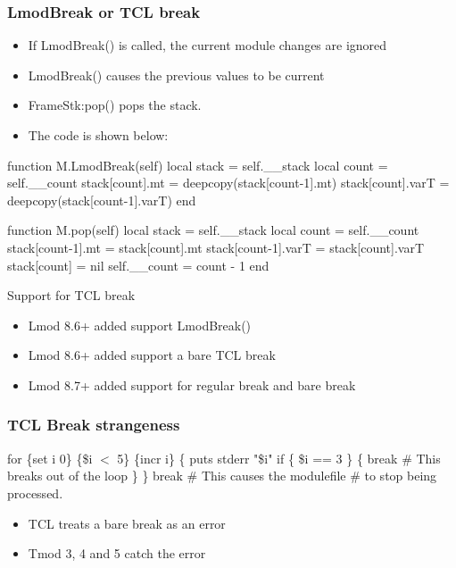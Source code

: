 \documentclass{beamer}
\begin{document}
\begin{frame}[fragile]
    \frametitle{LmodBreak or TCL break}
  \begin{itemize}
    \item If LmodBreak() is called, the current module changes are
      ignored
    \item LmodBreak() causes the previous values to be current
    \item FrameStk:pop() pops the stack.
    \item The code is shown below:
  \end{itemize}
 {\tiny
    \begin{semiverbatim}
function M.LmodBreak(self)
   local stack           = self.\_\_stack
   local count           = self.\_\_count
   stack[count].mt       = deepcopy(stack[count-1].mt)
   stack[count].varT     = deepcopy(stack[count-1].varT)
end

function M.pop(self)
   local stack           = self.\_\_stack
   local count           = self.\_\_count
   stack[count-1].mt     = stack[count].mt
   stack[count-1].varT   = stack[count].varT
   stack[count]          = nil
   self.__count          = count - 1
end
    \end{semiverbatim}
}
\end{frame}

\begin{frame}{Support for TCL break}
  \begin{itemize}
    \item Lmod 8.6+ added support LmodBreak()
    \item Lmod 8.6+ added support a bare TCL break
    \item Lmod 8.7+ added support for regular break and bare break
  \end{itemize}
\end{frame}

\begin{frame}[fragile]
    \frametitle{TCL Break strangeness}
 {\small
   \begin{semiverbatim}
for \{set i 0\} \{\$i $<$ 5\} \{incr i\} \{
  puts stderr "\$i"
  if \{ \$i == 3 \} \{
      break  # This breaks out of the loop
  \}
\}
break # This causes the modulefile
      # to stop being processed.       
    \end{semiverbatim}
}
  \begin{itemize}
    \item TCL treats a bare break as an error
    \item Tmod 3, 4 and 5 catch the error
  \end{itemize}
\end{frame}
\end{document}
